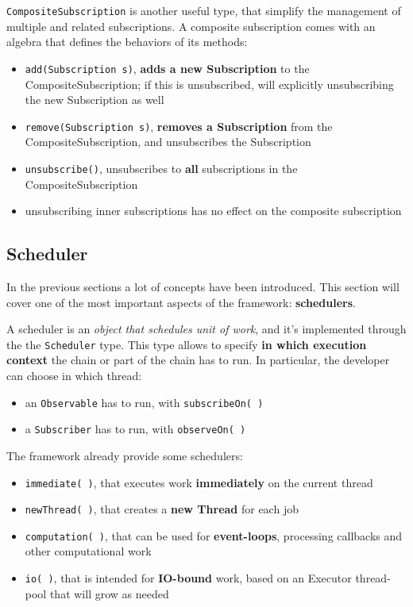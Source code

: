 \texttt{CompositeSubscription} is another useful type, that simplify the
management of multiple and related subscriptions. A composite
subscription comes with an algebra that defines the behaviors of its
methods:

\begin{itemize}
\itemsep1pt\parskip0pt
\item
  \texttt{add(Subscription\ s)}, \textbf{adds a new Subscription} to the
  CompositeSubscription; if this is unsubscribed, will explicitly
  unsubscribing the new Subscription as well
\item
  \texttt{remove(Subscription\ s)}, \textbf{removes a Subscription} from
  the CompositeSubscription, and unsubscribes the Subscription
\item
  \texttt{unsubscribe()}, unsubscribes to \textbf{all} subscriptions in
  the CompositeSubscription
\item
  unsubscribing inner subscriptions has no effect on the composite
  subscription
\end{itemize}


\subsection{Scheduler}\label{scheduler}

In the previous sections a lot of concepts have been introduced. This
section will cover one of the most important aspects of the framework:
\textbf{schedulers}.

A scheduler is an \emph{object that schedules unit of work}, and it's
implemented through the the \texttt{Scheduler} type. This type allows to
specify \textbf{in which execution context} the chain or part of the
chain has to run. In particular, the developer can choose in which
thread:

\begin{itemize}
\itemsep1pt\parskip0pt
\item
  an \texttt{Observable} has to run, with \texttt{subscribeOn(\ )}
\item
  a \texttt{Subscriber} has to run, with \texttt{observeOn(\ )}
\end{itemize}

The framework already provide some schedulers: 

\begin{itemize}
\itemsep1pt\parskip0pt
\item
  \texttt{immediate(\ )},
that executes work \textbf{immediately} on the current thread
\item
  \texttt{newThread(\ )}, that creates a \textbf{new Thread} for each job
\item
  \texttt{computation(\ )}, that can be used for \textbf{event-loops},
processing callbacks and other computational work 
\item
  \texttt{io(\ )},
that is intended for \textbf{IO-bound} work, based on an Executor
thread-pool that will grow as needed
\end{itemize}

